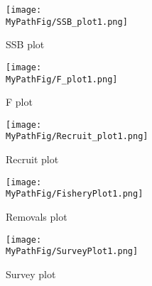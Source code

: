 \documentclass[]{report}
\begin{document}
\def\MyPathFig{"/home/dhennen/EIEIO/figures/"}
\label{fig:fig}
\begin{figure}
	\texttt{[image: \\MyPathFig/SSB\_plot1.png]}	
	\caption{SSB plot}	
	\label{SSB_plot1}
\end{figure}
\begin{figure} %
	{\texttt{[image: \\MyPathFig/F\_plot1.png]}}
		\caption{F plot}	
		\label{F_plot1}
\end{figure}
\begin{figure} %
	{\texttt{[image: \\MyPathFig/Recruit\_plot1.png]}}
		\caption{Recruit plot}	
		\label{Recr_plot1}	
\end{figure}	
\begin{figure} %
	{\texttt{[image: \\MyPathFig/FisheryPlot1.png]}}
		\caption{Removals plot}	
		\label{Fish_plot1}	
\end{figure}
\begin{figure} %
	{\texttt{[image: \\MyPathFig/SurveyPlot1.png]}}
		\caption{Survey plot}	
		\label{Surv_plot1}	
\end{figure}		



  
\end{document}

